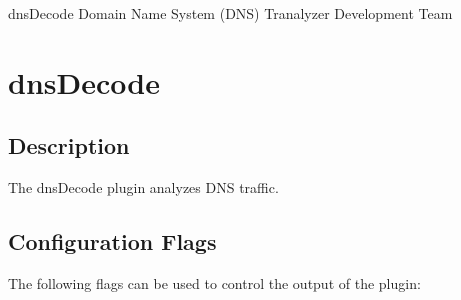 \documentclass[documentation]{subfiles}
\begin{document}
\trantitle
    {dnsDecode}
    {Domain Name System (DNS)}
    {Tranalyzer Development Team}

\section{dnsDecode}\label{s:dnsDecode}

\subsection{Description}
The dnsDecode plugin analyzes DNS traffic.

\subsection{Configuration Flags}\label{dnsDecode:config}
The following flags can be used to control the output of the plugin:
\end{document}
